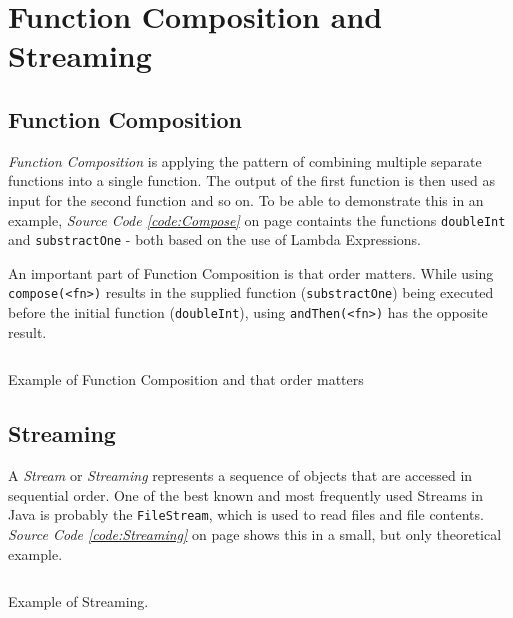 \documentclass[a4paper,12pt,twoside]{scrreprt}
\begin{document}
\clearpage

\section{Function Composition and Streaming}

\subsection{Function Composition}
\textit{Function Composition} is applying the pattern of combining multiple separate functions into a single function. The output of the first function is then used as input for the second function and so on. To be able to demonstrate this in an example, \textit{Source Code \ref{code:Compose}} on page \pageref{code:Compose} containts the functions \texttt{doubleInt} and \texttt{substractOne} - both based on the use of Lambda Expressions. 

An important part of Function Composition is that order matters. While using  \texttt{compose(<fn>)} results in the supplied function (\texttt{substractOne}) being executed before the initial function (\texttt{doubleInt}), using \texttt{andThen(<fn>)} has the opposite result.

\begin{listing}[ht]
    \inputminted[fontsize=\footnotesize,linenos,breaklines,breakanywhere]{java}{./code/FunctionComposition.java}
    \caption[Example of Function Composition and that order matters]{Example of Function Composition and that order matters}
    \label{code:Compose}
\end{listing}

\clearpage

\subsection{Streaming}
A \textit{Stream} or \textit{Streaming} represents a sequence of objects that are accessed in sequential order. One of the best known and most frequently used Streams in Java is probably the \texttt{FileStream}, which is used to read files and file contents. \textit{Source Code \ref{code:Streaming}} on page \pageref{code:Streaming} shows this in a small, but only theoretical example.

\begin{listing}[ht]
    \inputminted[fontsize=\footnotesize,linenos,breaklines]{java}{./code/Streaming.java}
    \caption[Example of Streaming]{Example of Streaming.}
    \label{code:Streaming}
\end{listing}
\end{document}

